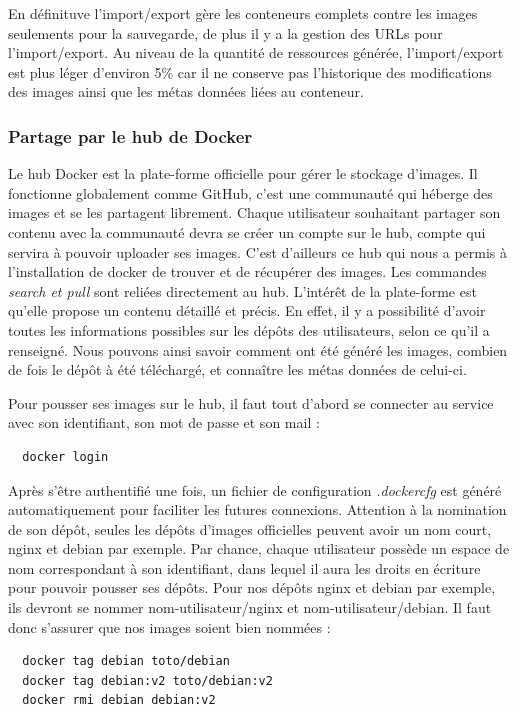 \documentclass[12pt,a4paper]{article}
\begin{document}
En définituve l'import/export gère les conteneurs complets contre les images seulements pour la sauvegarde, de plus il y a la gestion des URLs pour l'import/export. Au niveau de la quantité de ressources générée, l'import/export est plus léger d'environ 5\% car il ne conserve pas l'historique des modifications des images ainsi que les métas données liées au conteneur.

\subsubsection{Partage par le hub de Docker}

Le hub Docker est la plate-forme officielle pour gérer le stockage d'images. Il fonctionne globalement comme GitHub, c'est une communauté qui héberge des images et se les partagent librement. Chaque utilisateur souhaitant partager son contenu avec la communauté devra se créer un compte sur le hub, compte qui servira à pouvoir uploader ses images. C'est d'ailleurs ce hub qui nous a permis à l'installation de docker de trouver et de récupérer des images. Les commandes \textit{search et pull} sont reliées directement au hub. L'intérêt de la plate-forme est qu'elle propose un contenu détaillé et précis. En effet, il y a possibilité d'avoir toutes les informations possibles sur les dépôts des utilisateurs, selon ce qu'il a renseigné. Nous pouvons ainsi savoir comment ont été généré les images, combien de fois le dépôt à été téléchargé, et connaître les métas données de celui-ci.

Pour pousser ses images sur le hub, il faut tout d'abord se connecter au service avec son identifiant, son mot de passe et son mail :
\begin{lstlisting}
  docker login
\end{lstlisting}
Après s'être authentifié une fois, un fichier de configuration \textit{.dockercfg} est généré automatiquement pour faciliter les futures connexions. Attention à la nomination de son dépôt, seules les dépôts d'images officielles peuvent avoir un nom court, nginx et debian par exemple. Par chance, chaque utilisateur possède un espace de nom correspondant à son identifiant, dans lequel il aura les droits en écriture pour pouvoir pousser ses dépôts. Pour nos dépôts nginx et debian par exemple, ils devront se nommer nom-utilisateur/nginx et nom-utilisateur/debian. Il faut donc s'assurer que nos images soient bien nommées :

\begin{lstlisting}
  docker tag debian toto/debian
  docker tag debian:v2 toto/debian:v2
  docker rmi debian debian:v2
\end{lstlisting}
\end{document}
